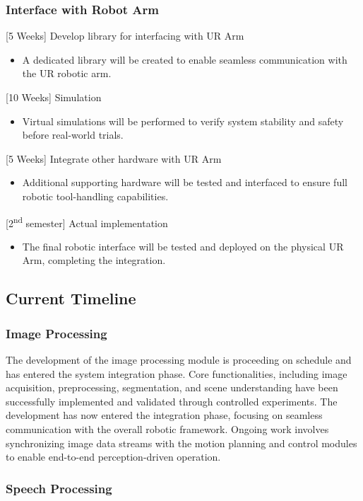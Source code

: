 \documentclass[12pt]{extarticle}
\begin{document}
\subsubsection{Interface with Robot Arm}
[5 Weeks] Develop library for interfacing with UR Arm
\begin{itemize}
    \item A dedicated library will be created to enable seamless communication with the UR robotic arm.
\end{itemize}
[10 Weeks] Simulation
\begin{itemize}
    \item Virtual simulations will be performed to verify system stability and safety before real-world trials.
\end{itemize}
[5 Weeks] Integrate other hardware with UR Arm
\begin{itemize}
    \item Additional supporting hardware will be tested and interfaced to ensure full robotic tool-handling capabilities.
\end{itemize}
[2\textsuperscript{nd} semester] Actual implementation
\begin{itemize}
    \item The final robotic interface will be tested and deployed on the physical UR Arm, completing the integration.
\end{itemize}

\subsection{Current Timeline}

\subsubsection{Image Processing}

The development of the image processing module is proceeding on schedule and has entered the system integration phase. Core functionalities, including image acquisition, preprocessing, segmentation, and scene understanding have been successfully implemented and validated through controlled experiments. The development has now entered the integration phase, focusing on seamless communication with the overall robotic framework. Ongoing work involves synchronizing image data streams with the motion planning and control modules to enable end-to-end perception-driven operation.

\subsubsection{Speech Processing}
\end{document}
